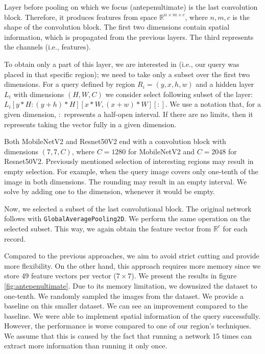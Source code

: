 Layer before pooling on which we focus (antepenultimate) is the last convolution block. Therefore, it produces features from space $\mathbb{R}^{n\times m \times c}$, where $n, m, c$ is the shape of the convolution block. The first two dimensions contain spatial information, which is propagated from the previous layers. The third represents the channels (i.e., features).

To obtain only a part of this layer, we are interested in (i.e., our query was placed in that specific region); we need to take only a subset over the first two dimensions. For a query defined by region $R_i = (y, x, h, w)$ and a hidden layer $L_i$ with dimensions $(H, W, C)$ we consider select following subset of the layer: $L_i[y * H: (y+h) * H][x*W, (x + w) * W][:]$. We use a notation that, for a given dimension, $:$ represents a half-open interval. If there are no limits, then it represents taking the vector fully in a given dimension.

Both MobileNetV2 and Resnet50V2 end with a convolution block with dimensions $(7,7,C)$, where $C = 1280$ for MobileNetV2 and $C = 2048$ for Resnet50V2. Previously mentioned selection of interesting regions may result in empty selection. For example, when the query image covers only one-tenth of the image in both dimensions. The rounding may result in an empty interval. We solve by adding one to the dimension, whenever it would be empty.

Now, we selected a subset of the last convolutional block. The original network follows with \verb+GlobalAveragePooling2D+. We perform the same operation on the selected subset. This way, we again obtain the feature vector from $\mathbb{R}^c$ for each record.

Compared to the previous approaches, we aim to avoid strict cutting and provide more flexibility. On the other hand, this approach requires more memory since we store 49 feature vectors per vector ($7\times7$). We present the results in figure \ref{fig:antepenultimate}. Due to its memory limitation, we downsized the dataset to one-tenth. We randomly sampled the images from the dataset. We provide a baseline on this smaller dataset. We can see an improvement compared to the baseline. We were able to implement spatial information of the query successfully. However, the performance is worse compared to one of our region's techniques. We assume that this is caused by the fact that running a network 15 times can extract more information than running it only once.

